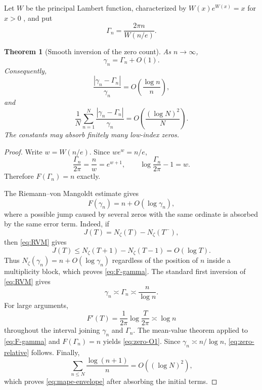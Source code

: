 \documentclass[11pt]{article}
\newtheorem{theorem}{Theorem}[section]
\theoremstyle{definition}
\theoremstyle{remark}
\begin{document}
Let $W$ be the principal Lambert function, characterized by $W(x)e^{W(x)}=x$ for $x>0$ \citep{CorlessEtAl1996}, and put
\begin{equation}\label{eq:Gamma-def}
    \Gamma_n=\frac{2\pi n}{W(n/e)}.
\end{equation}

\begin{theorem}[Smooth inversion of the zero count]\label{thm:smooth-zero}
As $n\to\infty$,
\begin{equation}\label{eq:zero-O1}
    \gamma_n=\Gamma_n+O(1).
\end{equation}
Consequently,
\begin{equation}\label{eq:zero-relative}
    \frac{|\gamma_n-\Gamma_n|}{\gamma_n}
    =O\left(\frac{\log n}{n}\right),
\end{equation}
and
\begin{equation}\label{eq:mape-envelope}
    \frac1N\sum_{n=1}^N
    \frac{|\gamma_n-\Gamma_n|}{\gamma_n}
    =O\left(\frac{(\log N)^2}{N}\right).
\end{equation}
The constants may absorb finitely many low-index zeros.
\end{theorem}

\begin{proof}
Write $w=W(n/e)$.  Since $we^w=n/e$,
\[
    \frac{\Gamma_n}{2\pi}=\frac{n}{w}=e^{w+1},
    \qquad
    \log\frac{\Gamma_n}{2\pi}-1=w.
\]
Therefore $F(\Gamma_n)=n$ exactly.

The Riemann--von Mangoldt estimate gives
\begin{equation}\label{eq:F-gamma}
    F(\gamma_n)=n+O(\log\gamma_n),
\end{equation}
where a possible jump caused by several zeros with the same ordinate is absorbed by the same error term.  Indeed, if
\[
    J(T)=N_\zeta(T)-N_\zeta(T^-),
\]
then \eqref{eq:RVM} gives
\[
    J(T)\le N_\zeta(T+1)-N_\zeta(T-1)=O(\log T).
\]
Thus $N_\zeta(\gamma_n)=n+O(\log\gamma_n)$ regardless of the position of $n$ inside a multiplicity block, which proves \eqref{eq:F-gamma}.
The standard first inversion of \eqref{eq:RVM} gives
\[
    \gamma_n\asymp\Gamma_n\asymp\frac{n}{\log n}.
\]
For large arguments,
\[
    F'(T)=\frac1{2\pi}\log\frac{T}{2\pi}\asymp\log n
\]
throughout the interval joining $\gamma_n$ and $\Gamma_n$.  The mean-value theorem applied to \eqref{eq:F-gamma} and $F(\Gamma_n)=n$ yields \eqref{eq:zero-O1}.  Since $\gamma_n\asymp n/\log n$, \eqref{eq:zero-relative} follows.  Finally,
\[
    \sum_{n\le N}\frac{\log(n+1)}{n}
    =O((\log N)^2),
\]
which proves \eqref{eq:mape-envelope} after absorbing the initial terms.
\end{proof}
\end{document}
